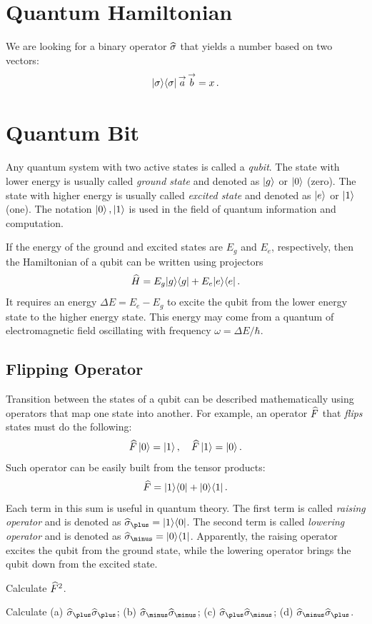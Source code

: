 \section{Quantum Hamiltonian}\label{sec:QuantumHamiltonian}
We are looking for a binary operator $\widehat{\sigma}$ that yields a number
based on two vectors:
\[
|{\sigma}\rangle\langle{\sigma}|\,\overset{\rightarrow}{a}\,\overset{\rightarrow}{b}=x\,.
\]


\section{Quantum Bit}\label{sec:Qubit}
Any quantum system with two active states is called a \emph{qubit}. The state with lower energy is usually called \emph{ground state} and denoted as $|{g}\rangle$ or $|{0}\rangle$ (zero). The state with higher energy is usually called \emph{excited state} and denoted as $|{e}\rangle$ or $|{1}\rangle$ (one). The notation $|{0}\rangle\,,|{1}\rangle$ is used in the field of quantum information and computation.

If the energy of the ground and excited states are $E_g$ and $E_e$, respectively, then the Hamiltonian of a qubit can be written using projectors
\[
\widehat{H} = E_g|{g}\rangle\langle{g}|+E_e|{e}\rangle\langle{e}|\,.
\]
It requires an energy $\Delta E=E_e-E_g$ to excite the qubit from the lower energy state to the higher energy state. This energy may come from a quantum of electromagnetic field oscillating with frequency $\omega=\Delta E/\hbar$.

\subsection{Flipping Operator}
Transition between the states of a qubit can be described mathematically using operators that map one state into another. For example, an operator $\widehat{F}$ that \emph{flips} states must do the following:
\[
\widehat{F}\,|{0}\rangle=|{1}\rangle\,,\quad \widehat{F}\,|{1}\rangle=|{0}\rangle\,.
\]
Such operator can be easily built from the tensor products:
\[
\widehat{F} = |{1}\rangle\langle{0}|+|{0}\rangle\langle{1}|\,.
\]
Each term in this sum is useful in quantum theory. The first term is called \emph{raising operator} and is denoted as 
$ \op{\sigma}_\plus=\ketbra{1}{0}$. The second term is called \emph{lowering operator} and is denoted as $ \op{\sigma}_\minus=\ketbra{0}{1}$. Apparently, the raising operator excites the qubit from the ground state, while the lowering operator brings the qubit down from the excited state.
\begin{exercise}
	Calculate $\widehat{F}^2$.
\end{exercise}
\begin{exercise}
	Calculate (a) $\op{\sigma}_\plus \op{\sigma}_\plus$; (b) $\op{\sigma}_\minus \op{\sigma}_\minus$; (c) $\op{\sigma}_\plus \op{\sigma}_\minus$; (d) $\op{\sigma}_\minus \op{\sigma}_\plus$.
\end{exercise}

